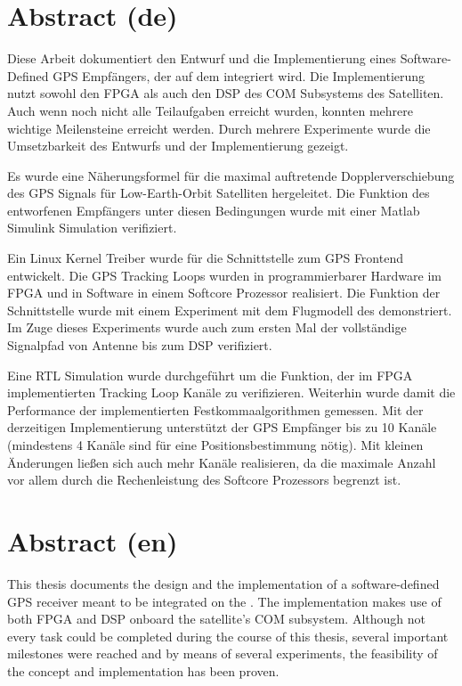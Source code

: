 \chapter*{Abstract (de)}
Diese Arbeit dokumentiert den Entwurf und die Implementierung eines Software-Defined GPS Empfängers, der auf dem \dscubesat integriert wird. Die Implementierung nutzt sowohl den FPGA als auch den DSP des COM Subsystems des Satelliten. Auch wenn noch nicht alle Teilaufgaben erreicht wurden, konnten mehrere wichtige Meilensteine erreicht werden. Durch mehrere Experimente wurde die Umsetzbarkeit des Entwurfs und der Implementierung gezeigt.

Es wurde eine Näherungsformel für die maximal auftretende Dopplerverschiebung des GPS Signals für Low-Earth-Orbit Satelliten hergeleitet. Die Funktion des entworfenen Empfängers unter diesen Bedingungen wurde mit einer Matlab Simulink Simulation verifiziert.

Ein Linux Kernel Treiber wurde für die Schnittstelle zum GPS Frontend entwickelt. Die GPS Tracking Loops wurden in programmierbarer Hardware im FPGA und in Software in einem Softcore Prozessor realisiert. Die Funktion der Schnittstelle wurde mit einem Experiment mit dem Flugmodell des \dscubesat demonstriert. Im Zuge dieses Experiments wurde auch zum ersten Mal der vollständige Signalpfad von Antenne bis zum DSP verifiziert.

Eine \gls{RTL} Simulation wurde durchgeführt um die Funktion, der im FPGA implementierten Tracking Loop Kanäle zu verifizieren. Weiterhin wurde damit die Performance der implementierten Festkommaalgorithmen gemessen. Mit der derzeitigen Implementierung unterstützt der GPS Empfänger bis zu 10 Kanäle (mindestens 4 Kanäle sind für eine Positionsbestimmung nötig). Mit kleinen Änderungen ließen sich auch mehr Kanäle realisieren, da die maximale Anzahl vor allem durch die Rechenleistung des Softcore Prozessors begrenzt ist.


\chapter*{Abstract (en)}

This thesis documents the design and the implementation of a software-defined GPS receiver meant to be integrated on the \dscubesat. The implementation makes use of both FPGA and DSP onboard the satellite's COM subsystem. Although not every task could be completed during the course of this thesis, several important milestones were reached and by means of several experiments, the feasibility of the concept and implementation has been proven.

